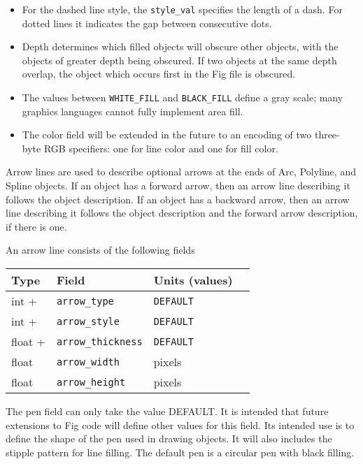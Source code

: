 \begin{itemize}
\item For the dashed line style, the {\tt style\_val}	specifies the length of a dash.
For dotted lines it indicates the gap between consecutive dots. 

\item Depth determines which filled objects will obscure other objects,
	with the objects of greater depth being obscured.
If two objects at the same depth overlap, the object which occurs first
	in the Fig file is obscured.

\item The values between {\tt WHITE\_FILL} and {\tt BLACK\_FILL} define
	a gray scale; many graphics languages cannot fully implement area fill.

\item The color field will be extended in the future to an encoding of two
	three-byte RGB specifiers: one for line color and one for fill color.
\end{itemize}

Arrow lines are used to describe optional arrows at the ends of
	Arc, Polyline, and Spline objects.
If an object has a forward arrow, then an arrow line describing it
	follows the object description.
If an object has a backward arrow, then an arrow line describing it
	follows the object description and the forward arrow description,
	if there is one.

An arrow line consists of the following fields
%
\vspace{4pt}
\begin{center}
\begin{tabular} {|l|l|ll|}
\hline
Type	& Field			& Units (values)	&	\\ \hline
\hline
%
int +	& {\tt arrow\_type}	& {\tt DEFAULT}		&	\\ \hline
%
int +	& {\tt arrow\_style}	& {\tt DEFAULT}		&	\\ \hline
%
float +	& {\tt arrow\_thickness}& {\tt DEFAULT}		&	\\ \hline
%
float	& {\tt arrow\_width}	& pixels		&	\\ \hline
%
float	& {\tt arrow\_height}	& pixels		&	\\ \hline
\end{tabular}
\end{center}
\vspace{2pt}

The pen field can only take the value DEFAULT.
It is intended that future extensions to Fig code will define
	other values for this field.
Its intended use is to define the shape of the pen used in drawing objects.
It will also includes the stipple pattern for line filling.
The default pen is a circular pen with black filling.

